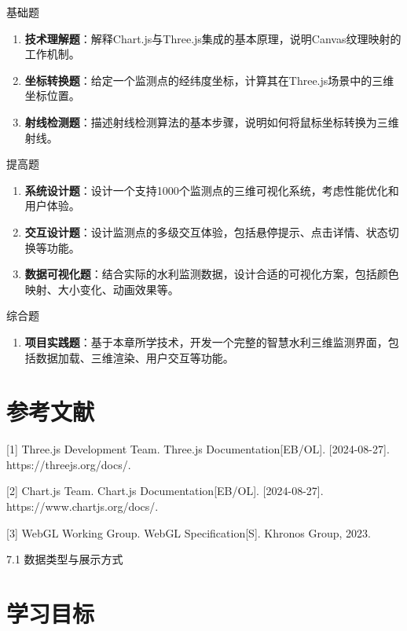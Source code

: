  基础题

\begin{enumerate}
\def\labelenumi{\arabic{enumi}.}
\item
  \textbf{技术理解题}：解释Chart.js与Three.js集成的基本原理，说明Canvas纹理映射的工作机制。
\item
  \textbf{坐标转换题}：给定一个监测点的经纬度坐标，计算其在Three.js场景中的三维坐标位置。
\item
  \textbf{射线检测题}：描述射线检测算法的基本步骤，说明如何将鼠标坐标转换为三维射线。
\end{enumerate}

 提高题

\begin{enumerate}
\def\labelenumi{\arabic{enumi}.}
\setcounter{enumi}{3}
\item
  \textbf{系统设计题}：设计一个支持1000个监测点的三维可视化系统，考虑性能优化和用户体验。
\item
  \textbf{交互设计题}：设计监测点的多级交互体验，包括悬停提示、点击详情、状态切换等功能。
\item
  \textbf{数据可视化题}：结合实际的水利监测数据，设计合适的可视化方案，包括颜色映射、大小变化、动画效果等。
\end{enumerate}

 综合题

\begin{enumerate}
\def\labelenumi{\arabic{enumi}.}
\setcounter{enumi}{6}
\tightlist
\item
  \textbf{项目实践题}：基于本章所学技术，开发一个完整的智慧水利三维监测界面，包括数据加载、三维渲染、用户交互等功能。
\end{enumerate}

\section{参考文献}

{[}1{]} Three.js Development Team. Three.js Documentation{[}EB/OL{]}. {[}2024-08-27{]}. https://threejs.org/docs/.

{[}2{]} Chart.js Team. Chart.js Documentation{[}EB/OL{]}. {[}2024-08-27{]}. https://www.chartjs.org/docs/.

{[}3{]} WebGL Working Group. WebGL Specification{[}S{]}. Khronos Group, 2023.

 7.1 数据类型与展示方式

\section{学习目标}

